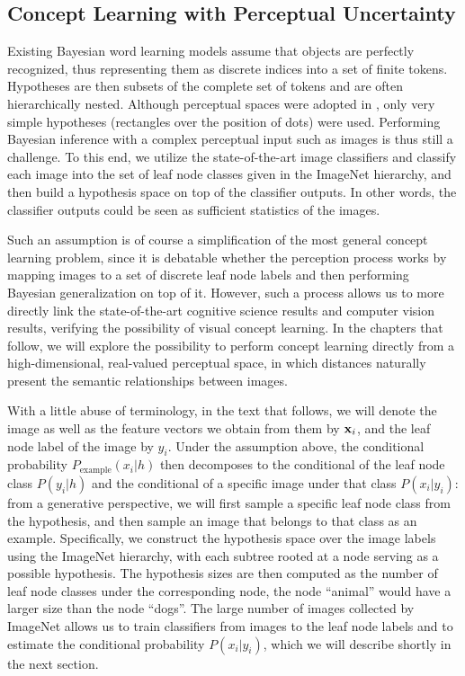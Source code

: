 \subsection{Concept Learning with Perceptual Uncertainty}
Existing Bayesian word learning models assume that objects are perfectly recognized, thus representing them as discrete indices into a set of finite tokens. Hypotheses are then subsets of the complete set of tokens and are often hierarchically nested. Although perceptual spaces were adopted in \cite{tenenbaum99}, only very simple hypotheses (rectangles over the position of dots) were used. Performing Bayesian inference with a complex perceptual input such as images is thus still a challenge. To this end, we utilize the state-of-the-art image classifiers and classify each image into the set of leaf node classes given in the ImageNet hierarchy, and then build a hypothesis space on top of the classifier outputs. In other words, the classifier outputs could be seen as sufficient statistics of the images.

Such an assumption is of course a simplification of the most general concept learning problem, since it is debatable whether the perception process works by mapping images to a set of discrete leaf node labels and then performing Bayesian generalization on top of it. However, such a process allows us to more directly link the state-of-the-art cognitive science results and computer vision results, verifying the possibility of visual concept learning. In the chapters that follow, we will explore the possibility to perform concept learning directly from a high-dimensional, real-valued perceptual space, in which distances naturally present the semantic relationships between images.

With a little abuse of terminology, in the text that follows, we will denote the image as well as the feature vectors we obtain from them by $\mathbf{x}_i$, and the leaf node label of the image by $y_i$. Under the assumption above, the conditional probability $P_{\mathrm{example}}(x_i|h)$ then decomposes to the conditional of the leaf node class $P(y_i|h)$ and the conditional of a specific image under that class $P(x_i | y_i)$: from a generative perspective, we will first sample a specific leaf node class from the hypothesis, and then sample an image that belongs to that class as an example. Specifically, we construct the hypothesis space over the image labels using the ImageNet hierarchy, with each subtree rooted at a node serving as a possible hypothesis. The hypothesis sizes are then computed as the number of leaf node classes under the corresponding node, \eg the node ``animal'' would have a larger size than the node ``dogs''. The large number of images collected by ImageNet allows us to train classifiers from images to the leaf node labels and to estimate the conditional probability $P(x_i|y_i)$, which we will describe shortly in the next section.

